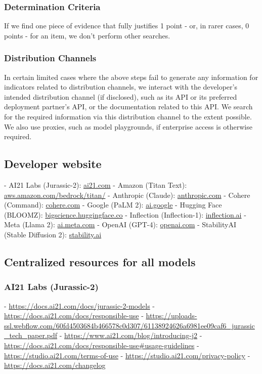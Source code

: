\documentclass[screen, authorversion, acmsmall]{acmart}
\begin{document}
\subsubsection{Determination Criteria}
If we find one piece of evidence that fully justifies 1 point - or, in rarer cases, 0 points - for an item, we don't perform other searches.

\subsubsection{Distribution Channels}
In certain limited cases where the above steps fail to generate any information for indicators related to distribution channels, we interact with the developer’s intended distribution channel (if disclosed), such as its API or its preferred deployment partner’s API, or the documentation related to this API. We search for the required information via this distribution channel to the extent possible. We also use proxies, such as model playgrounds, if enterprise access is otherwise required.

\subsection{Developer website}

-  AI21 Labs (Jurassic-2): \url{ai21.com}
-  Amazon (Titan Text): \url{aws.amazon.com/bedrock/titan/}
-  Anthropic (Claude): \url{anthropic.com}
-  Cohere (Command): \url{cohere.com}
-  Google (PaLM 2): \url{ai.google}
-  Hugging Face (BLOOMZ): \url{bigscience.huggingface.co}
-  Inflection (Inflection-1): \url{inflection.ai}
-  Meta (Llama 2): \url{ai.meta.com}
-  OpenAI (GPT-4): \url{openai.com}
-  StabilityAI (Stable Diffusion 2): \url{stability.ai}

\subsection{Centralized resources for all models}

\subsubsection{AI21 Labs (Jurassic-2)}
-  \url{https://docs.ai21.com/docs/jurassic-2-models}
-  \url{https://docs.ai21.com/docs/responsible-use}
-  \url{https://uploads-ssl.webflow.com/60fd4503684b466578c0d307/61138924626a6981ee09caf6_jurassic_tech_paper.pdf}
-  \url{https://www.ai21.com/blog/introducing-j2}
-  \url{https://docs.ai21.com/docs/responsible-use#usage-guidelines}
-  \url{https://studio.ai21.com/terms-of-use}
-  \url{https://studio.ai21.com/privacy-policy}
-  \url{https://docs.ai21.com/changelog}
\end{document}
